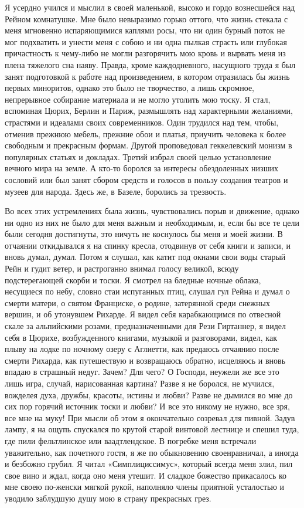 Я  усердно  учился  и  мыслил   в  своей  маленькой,  высоко  и  гордо
вознесшейся над Рейном комнатушке.  Мне было невыразимо горько оттого,
что жизнь стекала с меня  мгновенно испаряющимися каплями росы, что ни
один  бурный  поток  не  мог  подхватить  и  унести  меня  с  собою  и
ни  одна  пылкая страсть  или  глубокая  причастность к  чему-либо  не
могли  разгорячить мою  кровь и  вырвать  меня из  плена тяжелого  сна
наяву.  Правда,  кроме  каждодневного,  насущного труда  я  был  занят
подготовкой к работе над произведением,  в котором отразилась бы жизнь
первых  миноритов, однако  это было  не творчество,  а лишь  скромное,
непрерывное  собирание  материала и  не  могло  утолить мою  тоску.  Я
стал,  вспоминая Цюрих,  Берлин и  Париж, размышлять  над характерными
желаниями, страстями и идеалами своих современников. Один трудился над
тем, чтобы,  отменив прежнюю мебель,  прежние обои и  платья, приучить
человека к  более свободным  и прекрасным формам.  Другой проповедовал
геккелевский  монизм в  популярных статьях  и докладах.  Третий избрал
своей целью  установление вечного мира  на земле. А кто-то  боролся за
интересы обездоленных низших  сословий или был занят  сбором средств и
голосов в  пользу создания театров  и музеев  для народа. Здесь  же, в
Базеле, боролись за трезвость.

Во всех этих устремлениях была  жизнь, чувствовались порыв и движение,
однако ни одно из  них не было для меня важным  и необходимым, и, если
бы все  те цели были  сегодня достигнуты,  это ничуть не  коснулось бы
меня  и  моей  жизни.  В  отчаянии откидывался  я  на  спинку  кресла,
отодвинув  от себя  книги  и записи,  и вновь  думал,  думал. Потом  я
слушал, как  катит под окнами свои  воды старый Рейн и  гудит ветер, и
растроганно  внимал  голосу  великой, всюду  подстерегающей  скорби  и
тоски. Я смотрел  на бледные ночные облака, несущиеся  по небу, словно
стаи испуганных  птиц, слушал  гул Рейна  и думал  о смерти  матери, о
святом  Франциске, о  родине, затерянной  среди снежных  вершин, и  об
утонувшем Рихарде.  Я видел  себя карабкающимся  по отвесной  скале за
альпийскими розами, предназначенными для  Рези Гиртаннер, я видел себя
в  Цюрихе, возбужденного  книгами, музыкой  и разговорами,  видел, как
плыву  на лодке  по ночному  озеру с  Аглиетти, как  предаюсь отчаянию
после смерти Рихарда, как путешествую и возвращаюсь обратно, исцеляюсь
и вновь впадаю  в страшный недуг. Зачем? Для чего?  О Господи, неужели
же  все  это лишь  игра,  случай,  нарисованная  картина? Разве  я  не
боролся, не мучился,  вожделея духа, дружбы, красоты,  истины и любви?
Разве не дымился во  мне до сих пор горячий источник  тоски и любви? И
все  это никому  не нужно,  все зря,  все мне  на муку!  При мысли  об
этом  я окончательно  созревал для  пивной.  Задув лампу,  я на  ощупь
спускался по крутой  старой винтовой лестнице и спешил  туда, где пили
фельтлинское или ваадтлендское. В погребке меня встречали уважительно,
как почетного  гостя, я  же по обыкновению  своенравничал, а  иногда и
безбожно грубил.  Я читал «Симплициссимус», который  всегда меня злил,
пил  свое вино  и  ждал, когда  оно меня  утешит.  И сладкое  божество
прикасалось  ко  мне своею  по-женски  мягкой  рукой, наполняло  члены
приятной усталостью и  уводило заблудшую душу мою  в страну прекрасных
грез.

